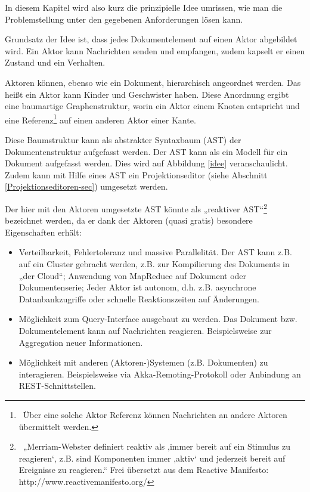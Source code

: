 
In diesem Kapitel wird also kurz die prinzipielle Idee umrissen, wie man die Problemstellung unter den gegebenen Anforderungen lösen kann.

 
Grundsatz der Idee ist, dass jedes Dokumentelement auf einen Aktor abgebildet wird. Ein Aktor kann Nachrichten senden und empfangen, zudem kapselt er einen Zustand und ein Verhalten.

 
Aktoren können, ebenso wie ein Dokument, hierarchisch angeordnet werden. Das heißt ein Aktor kann Kinder und Geschwister haben. Diese Anordnung ergibt eine baumartige Graphenstruktur, worin ein Aktor einem Knoten entspricht und eine Referenz\footnote{~Über eine solche Aktor Referenz können Nachrichten an andere Aktoren übermittelt werden.} auf einen anderen Aktor einer Kante.

 
Diese Baumstruktur kann als abstrakter Syntaxbaum (AST) der Dokumentenstruktur aufgefasst werden. Der AST kann als ein Modell für ein Dokument aufgefasst werden. Dies wird auf Abbildung \ref{idee} veranschaulicht. Zudem kann mit Hilfe eines AST ein Projektionseditor (siehe Abschnitt \ref{Projektionseditoren-sec}) umgesetzt werden.

 
Der hier mit den Aktoren umgesetzte AST könnte als „reaktiver AST“\footnote{~„Merriam-Webster definiert reaktiv als ‚immer bereit auf ein Stimulus zu reagieren‘, z.B. sind Komponenten immer ‚aktiv‘ und jederzeit bereit auf Ereignisse zu reagieren.“ Frei übersetzt aus dem Reactive Manifesto: http://www.reactivemanifesto.org/} bezeichnet werden, da er dank der Aktoren (quasi gratis) besondere Eigenschaften erhält:

 
\begin{itemize}

\item Verteilbarkeit, Fehlertoleranz und massive Parallelität. Der AST kann z.B. auf ein Cluster gebracht werden, z.B. zur Kompilierung des Dokuments in „der Cloud“; Anwendung von MapReduce auf Dokument oder Dokumentenserie; Jeder Aktor ist autonom, d.h. z.B. asynchrone Datanbankzugriffe oder schnelle Reaktionszeiten auf Änderungen.
\item Möglichkeit zum Query-Interface ausgebaut zu werden. Das Dokument bzw. Dokumentelement kann auf Nachrichten reagieren. Beispielsweise zur Aggregation neuer Informationen.
\item Möglichkeit mit anderen (Aktoren-)Systemen (z.B. Dokumenten) zu interagieren. Beispielsweise via Akka-Remoting-Protokoll oder Anbindung an REST-Schnittstellen.
\end{itemize}
 
